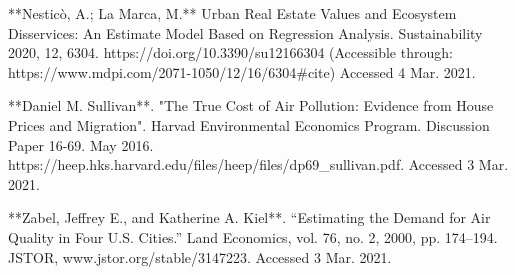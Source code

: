 \documentclass{article}
\begin{document}
\begin{markdown}
[nes]**Nesticò, A.; La Marca, M.** Urban Real Estate Values and Ecosystem Disservices: An Estimate Model Based on Regression Analysis. Sustainability 2020, 12, 6304. https://doi.org/10.3390/su12166304 (Accessible through: https://www.mdpi.com/2071-1050/12/16/6304#cite) Accessed 4 Mar. 2021.

**Daniel M. Sullivan**. "The True Cost of Air Pollution: Evidence from House Prices and Migration". Harvad Environmental Economics Program. Discussion Paper 16-69. May 2016. 
https://heep.hks.harvard.edu/files/heep/files/dp69_sullivan.pdf. Accessed 3 Mar. 2021.

**Zabel, Jeffrey E., and Katherine A. Kiel**. “Estimating the Demand for Air Quality in Four U.S. Cities.” Land Economics, vol. 76, no. 2, 2000, pp. 174–194. JSTOR, www.jstor.org/stable/3147223. Accessed 3 Mar. 2021.

\end{markdown}
\end{document}

